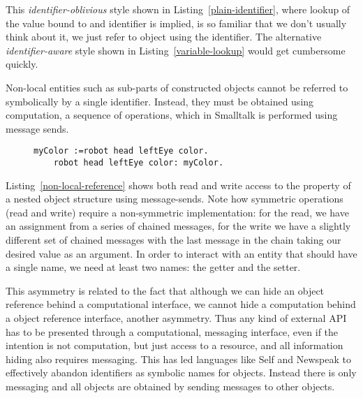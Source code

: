 \documentclass[preprint,authoryear]{acm_proc_article-sp}
\begin{document}
This  {\em identifier-oblivious} style shown in Listing~\ref{plain-identifier}, where lookup of the value bound to and
identifier is implied, is so familiar that we don't usually think about it, we just
refer to object using the identifier.
The alternative {\em identifier-aware} style shown in Listing~\ref{variable-lookup} would get cumbersome quickly.

Non-local entities such as sub-parts of constructed objects 
cannot be referred to symbolically by a single identifier.
Instead, they must be obtained using computation, a 
sequence of operations, which in Smalltalk is performed using message sends.


\begin{figure}[htbp]
\begin{lstlisting}[style=L,label=non-local-reference,caption=Accessing objects via chained message sends.]
	myColor :=robot head leftEye color.
	robot head leftEye color: myColor.
\end{lstlisting}
\end{figure}

Listing~\ref{non-local-reference} shows both read and write access to the property
of a nested object structure using message-sends.  Note how symmetric operations
(read and write) require a non-symmetric implementation:  for the read, we have an assignment
from a series of chained messages, for the write we have a slightly different set of 
chained messages with the last message in the chain taking our desired value
as an argument.  In order to interact with an entity that should have a single name,
we need at least two names:  the getter and the setter.

This asymmetry is related to the fact that although we can hide an object reference 
behind a computational interface, we cannot
hide a computation behind a object reference interface, another asymmetry.
Thus any kind of external API has to be presented through a computational, messaging 
interface, even if the intention is not computation, but just access to a resource,
  and all information hiding also requires messaging.  This has led languages
like Self \cite{UngarS87} and Newspeak \cite{newspeak} to effectively abandon identifiers as symbolic names for objects. Instead there is only messaging and
all objects are obtained by sending messages to other objects.
\end{document}
